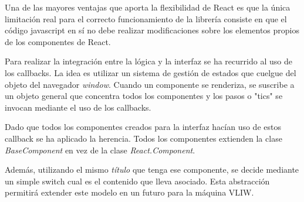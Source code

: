 Una de las mayores ventajas que aporta la flexibilidad de React es que la única limitación 
real para el correcto funcionamiento de la librería consiste en que el código javascript 
en sí no debe realizar modificaciones sobre los elementos propios de los componentes de React.

\bigskip
Para realizar la integración entre la lógica y la interfaz se ha recurrido al uso de los callbacks.
La idea es utilizar un sistema de gestión de estados que cuelgue del objeto del navegador \textit{window}.
Cuando un componente se renderiza, se suscribe a un objeto general que concentra todos los componentes
y los pasos o "tics" se invocan mediante el uso de los callbacks.

\bigskip
Dado que todos los componentes creados para la interfaz hacían uso de estos callback se ha aplicado la 
herencia. Todos los componentes extienden la clase \textit{BaseComponent} en vez de la clase 
\textit{React.Component}.

\bigskip
Además, utilizando el mismo \textit{título} que tenga ese componente, se decide mediante un simple switch
cual es el contenido que lleva asociado. Esta abstracción permitirá extender este modelo en un futuro 
para la máquina VLIW.